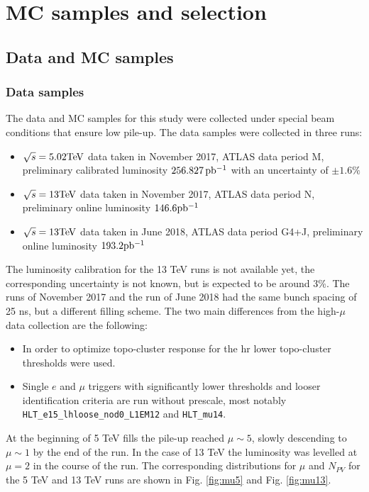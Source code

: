 \chapter{MC samples and selection}
    \label{sec:samples_selection}
    \section{Data and MC samples}
     \subsection{Data samples}
    The data and MC samples for this study were collected under special beam conditions that ensure low pile-up. The data samples were collected in three runs:
    \begin{itemize}
    \item $\sqrt{s} = 5.02\text{Te\kern -0.1em V}$ data taken in November 2017, ATLAS data
    period M, preliminary calibrated luminosity $256.827\,\mbox{pb\(^{-1}\)}$ with an uncertainty
    of $\pm 1.6\%$
    \item $\sqrt{s} = 13\text{Te\kern -0.1em V}$ data taken in November 2017, ATLAS data
    period N, preliminary online luminosity $146.6\mbox{pb\(^{-1}\)}$
    \item $\sqrt{s} = 13\text{Te\kern -0.1em V}$ data taken in June 2018, ATLAS data
    period G4+J, preliminary online luminosity $193.2\mbox{pb\(^{-1}\)}$
    \end{itemize}
	The luminosity  calibration for the 13 TeV runs is not available yet, the corresponding uncertainty is not known, but is expected to be around 3\%. The runs of November 2017 and the run of June 2018 had the same bunch spacing of 25 ns, but a different filling scheme. The two main differences from the high-$\mu$ data collection are the following:
	\begin{itemize}
	\item In order to optimize topo-cluster response for the \gls{hr} lower topo-cluster thresholds were used. 
	\item Single $e$ and $\mu$ triggers with significantly lower
	thresholds and looser identification criteria are run without
	prescale, most notably \texttt{HLT\_e15\_lhloose\_nod0\_L1EM12} and
	\texttt{HLT\_mu14}.
	\end{itemize}	
	At the beginning of 5 TeV fills the pile-up reached $\mu \sim 5$, slowly descending to $\mu \sim 1$ by the end of the run. In the case of 13 TeV the luminosity was levelled at $\mu = 2$ in the course of the run. The corresponding distributions for $\mu$ and $N_{PV}$ for the 5 TeV and 13 TeV runs are shown in Fig. \ref{fig:mu5} and Fig. \ref{fig:mu13}.
